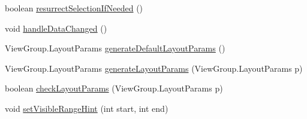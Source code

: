 \begin{DoxyCompactItemize}
\item 
boolean \hyperlink{classit_1_1sephiroth_1_1android_1_1library_1_1widget_1_1_abs_h_list_view_aa74868136e81ce8223daf16663b6f1ae}{resurrect\+Selection\+If\+Needed} ()
\item 
void \hyperlink{classit_1_1sephiroth_1_1android_1_1library_1_1widget_1_1_abs_h_list_view_a23fedb1b5dae6022420533dc95e51bba}{handle\+Data\+Changed} ()
\item 
View\+Group.\+Layout\+Params \hyperlink{classit_1_1sephiroth_1_1android_1_1library_1_1widget_1_1_abs_h_list_view_a8eec7428d67a6a4be94f47ab772abc21}{generate\+Default\+Layout\+Params} ()
\item 
View\+Group.\+Layout\+Params \hyperlink{classit_1_1sephiroth_1_1android_1_1library_1_1widget_1_1_abs_h_list_view_a01acd2ed79778007372940121b6bde58}{generate\+Layout\+Params} (View\+Group.\+Layout\+Params p)
\item 
boolean \hyperlink{classit_1_1sephiroth_1_1android_1_1library_1_1widget_1_1_abs_h_list_view_a51c606eb1430b6b5c99a395ccd2dc9b1}{check\+Layout\+Params} (View\+Group.\+Layout\+Params p)
\item 
void \hyperlink{classit_1_1sephiroth_1_1android_1_1library_1_1widget_1_1_abs_h_list_view_a6f856a249bfa8c6ff0bc9955a9b39c29}{set\+Visible\+Range\+Hint} (int start, int end)
\end{DoxyCompactItemize}
